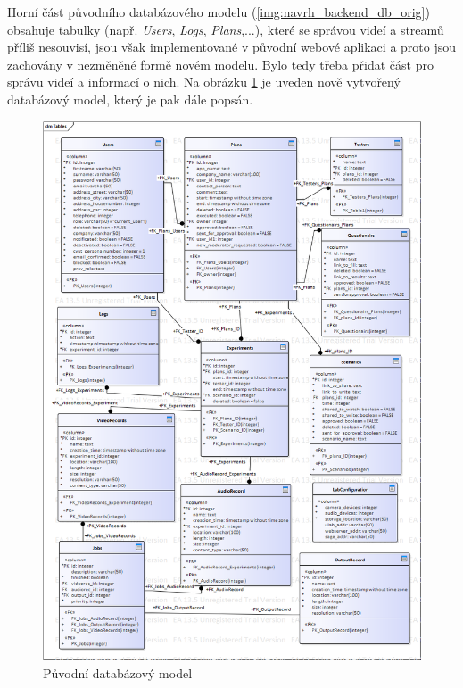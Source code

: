 \documentclass[thesis=M,czech]{FITthesis}[2012/06/26]
\begin{document}
Horní část původního databázového modelu (\ref{img:navrh_backend_db_orig}) obsahuje tabulky (např. \textit{Users}, \textit{Logs}, \textit{Plans},...), které se správou videí a streamů příliš nesouvisí, jsou však implementované v původní webové aplikaci a proto jsou zachovány v nezměněné formě novém modelu. Bylo tedy třeba přidat část pro správu videí a informací o nich. Na obrázku \ref{img:navrh_backend_db} je uveden nově vytvořený databázový model, který je pak dále popsán.
\\
\begin{figure}[h]\centering
	\includegraphics[width=1\textwidth]{images/db.png}
	\caption{Původní databázový model}\label{img:navrh_backend_db}
\end{figure}
\end{document}
